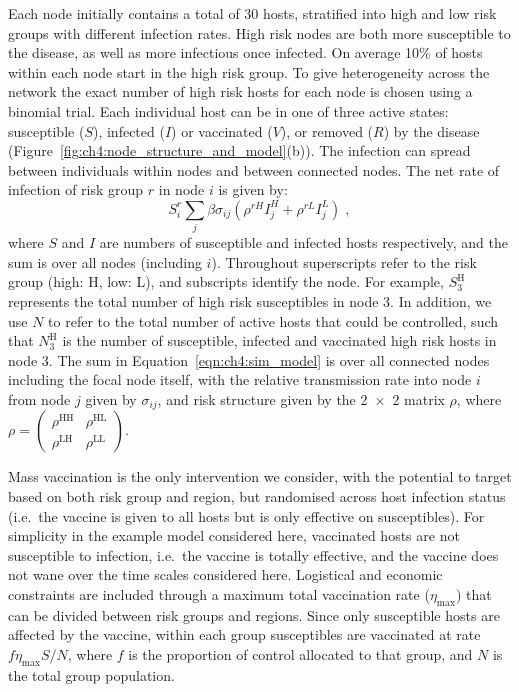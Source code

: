 Each node initially contains a total of 30 hosts, stratified into high and low risk groups with different infection rates. High risk nodes are both more susceptible to the disease, as well as more infectious once infected. On average 10\% of hosts within each node start in the high risk group. To give heterogeneity across the network the exact number of high risk hosts for each node is chosen using a binomial trial. Each individual host can be in one of three active states: susceptible ($S$), infected ($I$) or vaccinated ($V$), or removed ($R$) by the disease (Figure~\ref{fig:ch4:node_structure_and_model}(b)). The infection can spread between individuals within nodes and between connected nodes. The net rate of infection of risk group $r$ in node $i$ is given by:
\begin{equation}\label{eqn:ch4:sim_model}
    S_i^r \sum_j\beta\sigma_{ij} \left(\rho^{rH}I_j^H + \rho^{rL}I_j^L\right)\;,
\end{equation}
where $S$ and $I$ are numbers of susceptible and infected hosts respectively, and the sum is over all nodes (including $i$). Throughout superscripts refer to the risk group (high: H, low: L), and subscripts identify the node. For example, $S_{3}^\mathrm{H}$ represents the total number of high risk susceptibles in node 3. In addition, we use $N$ to refer to the total number of active hosts that could be controlled, such that $N_{3}^\mathrm{H}$ is the number of susceptible, infected and vaccinated high risk hosts in node 3. The sum in Equation~\ref{eqn:ch4:sim_model} is over all connected nodes including the focal node itself, with the relative transmission rate into node $i$ from node $j$ given by $\sigma_{ij}$, and risk structure given by the \num{2x2} matrix $\rho$, where $\rho = \left(\begin{smallmatrix}
    \rho^{\mathrm{HH}}& \rho^{\mathrm{HL}}\\
    \rho^{\mathrm{LH}}& \rho^{\mathrm{LL}}
    \end{smallmatrix}\right)$.

Mass vaccination is the only intervention we consider, with the potential to target based on both risk group and region, but randomised across host infection status (i.e.\ the vaccine is given to all hosts but is only effective on susceptibles). For simplicity in the example model considered here, vaccinated hosts are not susceptible to infection, i.e.\ the vaccine is totally effective, and the vaccine does not wane over the time scales considered here. Logistical and economic constraints are included through a maximum total vaccination rate ($\eta_{\mathrm{max}}$) that can be divided between risk groups and regions. Since only susceptible hosts are affected by the vaccine, within each group susceptibles are vaccinated at rate $f\eta_{\mathrm{max}}S/N$, where $f$ is the proportion of control allocated to that group, and $N$ is the total group population.

